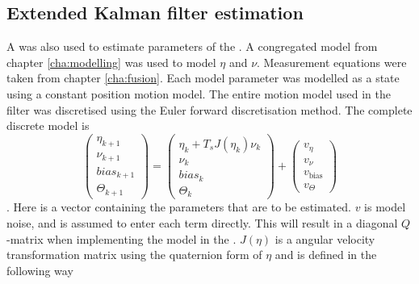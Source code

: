 \subsection{Extended Kalman filter estimation}
A \abbrEKF was also used to estimate parameters of the \abbrROV. A congregated model from chapter \ref{cha:modelling} was used to model $\eta$ and $\nu$. Measurement equations were taken from chapter \ref{cha:fusion}. Each model parameter was modelled as a state using a constant position motion model. The entire motion model used in the filter was discretised using the Euler forward discretisation method. The complete discrete model is
\begin{equation}
\label{eq:motionModelKalman}
\begin{pmatrix}
\eta_{k+1}\\ 
\nu_{k+1}\\
bias_{k+1}\\
\Theta_{k+1}
\end{pmatrix} = 
\begin{pmatrix}
\eta_k + T_s J(\eta_k)\nu_k\\
\nu_k\\
bias_k\\
\Theta_k
\end{pmatrix}
+ \begin{pmatrix}
v_{\eta}\\
v_{\nu}\\
v_{\textrm{bias}}\\
v_{\Theta}
\end{pmatrix}
\end{equation}.
Here \Theta is a vector containing the parameters that are to be estimated. $v$ is model noise, and is assumed to enter each term directly. This will result in a diagonal $Q$-matrix when implementing the model in the \abbrEKF. $J(\eta)$ is a angular velocity transformation matrix using the quaternion form of $\eta$ and is defined in the following way

